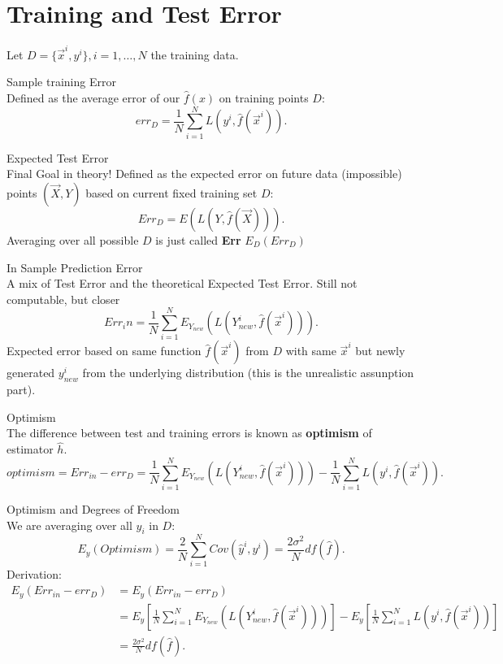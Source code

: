 \documentclass[a4paper]{article}
\begin{document}
\section{Training and Test Error}
Let $D = \{\vec{x}^i, y^i\}, i = 1,\ldots,N$ the training data.
\begin{definition}{Sample training Error} \\
  Defined as the average error of our $\hat{f}(x)$ on training points $D$:
  \[
    err_D = \frac{1}{N} \sum_{i=1}^N L(y^i, \hat{f}(\vec{x}^i))
  .\] 
\end{definition}

\begin{definition}{Expected Test Error} \\
  Final Goal in theory! Defined as the expected error on future data (impossible) points $(\vec{X}, Y)$ based on
  current fixed training set $D$:
   \[
     Err_D = E(L(Y, \hat{f}(\vec{X})))
  .\] 
  Averaging over all possible $D$ is just called \textbf{Err} $E_D(Err_D)$
\end{definition}
\begin{definition}{In Sample Prediction Error} \\
  A mix of Test Error and the theoretical Expected Test Error. Still not computable, but closer
  \[
    Err_in =\frac{1}{N} \sum_{i=1}^N E_{Y_{new}} (L(Y_{new}^i, \hat{f}(\vec{x}^i)))
  .\] 
  Expected error based on same function $\hat{f}\left( \vec{x}^i \right) $ from $D$ with same $\vec{x}^i$
  but newly generated  $y_{new}^i$ from the underlying distribution (this is the unrealistic assunption part).
\end{definition}

\begin{definition}{Optimism} \\
  The difference between test and training errors is known as \textbf{optimism} of estimator $\hat{h}$.
  \[
  optimism = Err_{in} - err_D = \frac{1}{N} \sum_{i=1}^N E_{Y_{new}} (L(Y_{new}^i, \hat{f}(\vec{x}^i))) - \frac{1}{N} \sum_{i=1}^N L(y^i, \hat{f}(\vec{x}^i))
  .\]  
\end{definition}

\begin{theorem}{Optimism and Degrees of Freedom}\\
  We are averaging over all $y_i$ in $D$:
  \[
  E_y(Optimism) = \frac{2}{N} \sum_{i=1}^N Cov(\hat{y}^i, y^i) = \frac{2 \sigma^2}{N} df(\hat{f})
  .\]
Derivation:
\begin{align*}
  E_y(Err_{in} - err_D) &= E_y(Err_{in} - err_D) \\
                        &= E_y[\frac{1}{N} \sum_{i=1}^N E_{Y_{new}} (L(Y_{new}^i, \hat{f}(\vec{x}^i)))] - E_y[\frac{1}{N} \sum_{i=1}^N L(y^i, \hat{f}(\vec{x}^i))] \\
                        &= \frac{2 \sigma^2}{N} df(\hat{f})
.\end{align*}
\end{theorem}
\end{document}

